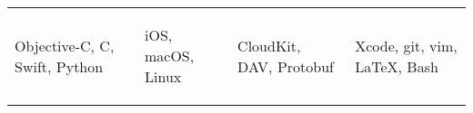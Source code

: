 

\begin{cvparagraph}

\begin{tabular*}{\textwidth}{L{4.5cm} L{4.5cm} L{4.5cm} L{4.5cm}}
\begin{cvitems}
	\item Objective-C, C, Swift, Python
\end{cvitems} &
\begin{cvitems}
	\item iOS, macOS, Linux
\end{cvitems} &
\begin{cvitems}
	\item CloudKit, DAV, Protobuf
\end{cvitems}&
\begin{cvitems}
	\item Xcode, git, vim, \LaTeX{}, Bash
\end{cvitems}
\end{tabular*}
\end{cvparagraph}
